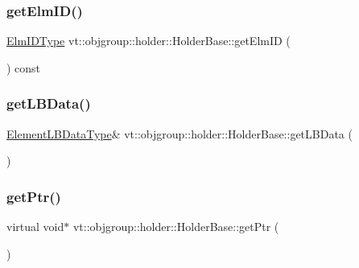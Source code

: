 \subsubsection{\texorpdfstring{get\+Elm\+I\+D()}{getElmID()}}
{\footnotesize\ttfamily \hyperlink{structvt_1_1objgroup_1_1holder_1_1_holder_base_a89c0ce1f23237ab00aee86d4d339bc50}{Elm\+I\+D\+Type} vt\+::objgroup\+::holder\+::\+Holder\+Base\+::get\+Elm\+ID (\begin{DoxyParamCaption}{ }\end{DoxyParamCaption}) const\hspace{0.3cm}{\ttfamily [inline]}}

\mbox{\label{structvt_1_1objgroup_1_1holder_1_1_holder_base_aa4ebca4b40c0c1904650ea6a64342732}} 
\subsubsection{\texorpdfstring{get\+L\+B\+Data()}{getLBData()}}
{\footnotesize\ttfamily \hyperlink{structvt_1_1objgroup_1_1holder_1_1_holder_base_a53deb78d918d7281cf01a0f09e410411}{Element\+L\+B\+Data\+Type}\& vt\+::objgroup\+::holder\+::\+Holder\+Base\+::get\+L\+B\+Data (\begin{DoxyParamCaption}{ }\end{DoxyParamCaption})\hspace{0.3cm}{\ttfamily [inline]}}

\mbox{\label{structvt_1_1objgroup_1_1holder_1_1_holder_base_a0b40d32b476b94586468abb5ae9a53a6}} 
\subsubsection{\texorpdfstring{get\+Ptr()}{getPtr()}}
{\footnotesize\ttfamily virtual void$\ast$ vt\+::objgroup\+::holder\+::\+Holder\+Base\+::get\+Ptr (\begin{DoxyParamCaption}{ }\end{DoxyParamCaption})\hspace{0.3cm}{\ttfamily [pure virtual]}}



